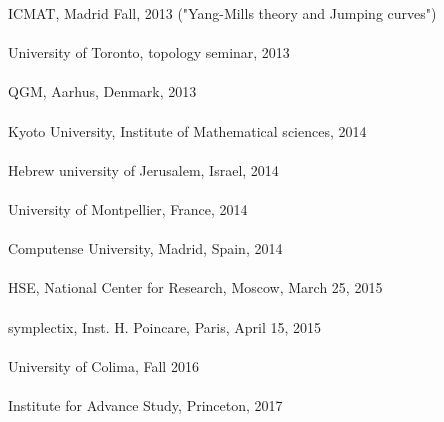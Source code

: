 \documentclass[overlapped,line,letterpaper]{res}
\begin{document}
\begin{resume}
ICMAT, Madrid Fall, 2013 ("Yang-Mills theory and Jumping curves") \\\\
University of Toronto, topology seminar, 2013 \\\\
QGM, Aarhus, Denmark, 2013 \\\\
Kyoto University, Institute of Mathematical sciences, 2014 \\\\
Hebrew university of Jerusalem, Israel, 2014 \\\\
University of Montpellier, France, 2014 \\\\
Computense University, Madrid, Spain, 2014\\\\
HSE, National Center for Research, Moscow, March 25, 2015 \\\\
symplectix, Inst. H. Poincare, Paris, April 15, 2015 \\\\
University of Colima, Fall 2016 \\\\
Institute for Advance Study, Princeton, 2017

\end{resume}
\end{document}
